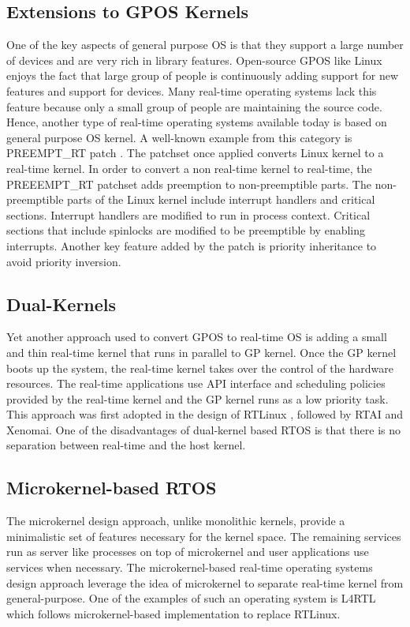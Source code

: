 \subsection{Extensions to GPOS Kernels} \label{sec:rtos-ext-gpos}
One of the key aspects of general purpose OS is that they support a large number of devices and are very rich in library features. 
Open-source GPOS like Linux enjoys the fact that large group of people is continuously adding support for new features and support for devices.
Many real-time operating systems lack this feature because only a small group of people are maintaining the source code. 
Hence, another type of real-time operating systems available today is based on general purpose OS kernel.
A well-known example from this category is PREEMPT\_RT patch \cite{PREEMPT-RT}. 
The patchset once applied converts Linux kernel to a real-time kernel.
In order to convert a non real-time kernel to real-time, the PREEEMPT\_RT patchset adds preemption to non-preemptible parts.
The non-preemptible parts of the Linux kernel include interrupt handlers and critical sections.
Interrupt handlers are modified to run in process context. 
Critical sections that include spinlocks are modified to be preemptible by enabling interrupts.
Another key feature added by the patch is priority inheritance to avoid priority inversion.  

\subsection{Dual-Kernels}
Yet another approach used to convert GPOS to real-time OS is adding a small and thin real-time kernel that runs in parallel to GP kernel.
Once the GP kernel boots up the system, the real-time kernel takes over the control of the hardware resources.
The real-time applications use API interface and scheduling policies provided by the real-time kernel and the GP kernel runs as a low priority task.
This approach was first adopted in the design of RTLinux \cite{yodaiken1999rtlinux}, followed by RTAI \cite{RTAI} and Xenomai\cite{Xenomai}. 
One of the disadvantages of dual-kernel based RTOS is that there is no separation between real-time and the host kernel.

\subsection{Microkernel-based RTOS}
The microkernel design approach, unlike monolithic kernels, provide a minimalistic set of features necessary for the kernel space. 
The remaining services run as server like processes on top of microkernel and user applications use services when necessary.
The microkernel-based real-time operating systems design approach leverage the idea of microkernel to separate real-time kernel from general-purpose.
One of the examples of such an operating system is L4RTL \cite{mehnert2001rtlinux} which follows microkernel-based implementation to replace RTLinux\cite{yodaiken1999rtlinux}.

